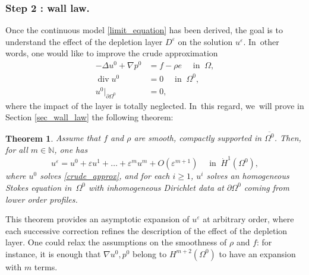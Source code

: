 \documentclass[10pt]{amsart}
\renewcommand{\div}{\operatorname{div}}
\theoremstyle{plain}
\newtheorem{thm}{Theorem}[section]
\theoremstyle{definition}
\let\pa\partial
\let\na\nabla
\let\eps\varepsilon
\newcommand{\N}{\mathbb{N}}
\begin{document}
\subsubsection*{Step 2 : wall law.}
Once the continuous model \eqref{limit_equation} has been derived, the goal is to understand the effect of the depletion layer $D^\eps$ on the solution $u^\eps$. In~other words, one would like to improve the crude approximation
\begin{equation} \label{crude_approx}
\begin{aligned}
-\Delta u^0 + \na p^0 &= f - \rho e \quad \text{ in } \: \Omega, \\
\div u^0 & = 0 \quad \text{ in } \: \Omega^0, \\
u^0 \vert_{\pa \Omega^0} & = 0,
\end{aligned}
\end{equation}
where the impact of the layer is totally neglected. In~this regard, we~will prove in Section \ref{sec_wall_law} the following theorem:
\begin{thm} \label{thm2}
Assume that $f$ and $\rho$ are smooth, compactly supported in $\overline{\Omega^0}$. Then, for all $m \in \N$, one has
\[
u^\eps = u^0 + \eps u^1 + \dots + \eps^m u^m + O(\eps^{m+1}) \quad \text{ in } \: \dot{H}^1(\Omega^0),
\]
where $u^0$ solves \eqref{crude_approx}, and for each $i \ge 1$, $u^i$ solves an homogeneous Stokes equation in~$\Omega^0$ with inhomogeneous Dirichlet data at $\pa \Omega^0$ coming from lower order profiles.
\end{thm}
This theorem provides an asymptotic expansion of $u^\eps$ at arbitrary order, where each successive correction refines the description of the effect of the depletion layer. One could relax the assumptions on the smoothness of $\rho$ and $f$: for instance, it is enough that $\na u^0,p^0$ belong to $H^{m+2}(\Omega^0)$ to have an expansion with $m$ terms.
\end{document}
